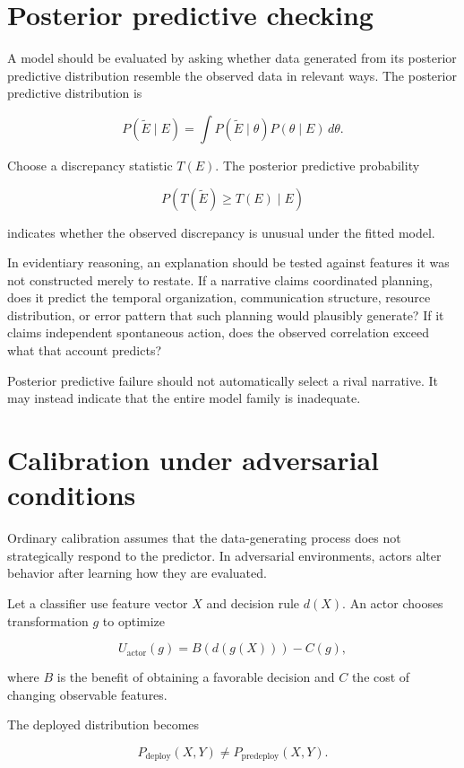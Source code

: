 \section{Posterior predictive checking}
\label{sec:a47}

A model should be evaluated by asking whether data generated from its posterior predictive distribution resemble the observed data in relevant ways. The posterior predictive distribution is

\[
P(\widetilde E\mid E)
=
\int
P(\widetilde E\mid\theta)
P(\theta\mid E)
\,d\theta.
\]

Choose a discrepancy statistic \(T(E)\). The posterior predictive probability

\[
P\left(
T(\widetilde E)\geq T(E)
\mid E
\right)
\]

indicates whether the observed discrepancy is unusual under the fitted model.

In evidentiary reasoning, an explanation should be tested against features it was not constructed merely to restate. If a narrative claims coordinated planning, does it predict the temporal organization, communication structure, resource distribution, or error pattern that such planning would plausibly generate? If it claims independent spontaneous action, does the observed correlation exceed what that account predicts?

Posterior predictive failure should not automatically select a rival narrative. It may instead indicate that the entire model family is inadequate.

\section{Calibration under adversarial conditions}
\label{sec:a48}

Ordinary calibration assumes that the data-generating process does not strategically respond to the predictor. In adversarial environments, actors alter behavior after learning how they are evaluated.

Let a classifier use feature vector \(X\) and decision rule \(d(X)\). An actor chooses transformation \(g\) to optimize

\[
U_{\mathrm{actor}}(g)
=
B(d(g(X)))-C(g),
\]

where \(B\) is the benefit of obtaining a favorable decision and \(C\) the cost of changing observable features.

The deployed distribution becomes

\[
P_{\mathrm{deploy}}(X,Y)
\neq
P_{\mathrm{predeploy}}(X,Y).
\]

